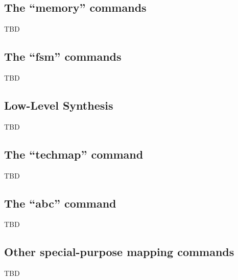 \subsection{The ``memory'' commands}

\begin{frame}{\subsecname}
TBD
\end{frame}


\subsection{The ``fsm'' commands}

\begin{frame}{\subsecname}
TBD
\end{frame}


\subsection{Low-Level Synthesis}

\begin{frame}{\subsecname}
TBD
\end{frame}


\subsection{The ``techmap'' command}

\begin{frame}{\subsecname}
TBD
\end{frame}


\subsection{The ``abc'' command}

\begin{frame}{\subsecname}
TBD
\end{frame}


\subsection{Other special-purpose mapping commands}

\begin{frame}{\subsecname}
TBD
\end{frame}


